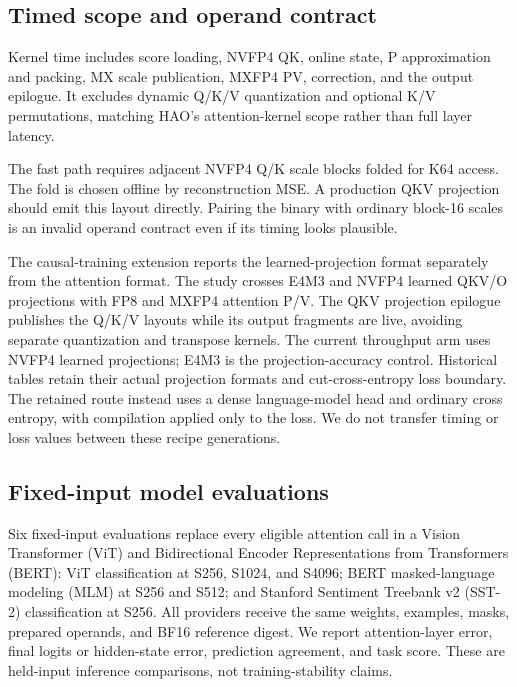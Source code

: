 \subsection{Timed scope and operand contract}

Kernel time includes score loading, NVFP4 QK, online state, P approximation
and packing, MX scale publication, MXFP4 PV, correction, and the output
epilogue. It excludes dynamic Q/K/V quantization and optional K/V
permutations, matching HAO's attention-kernel scope rather than full layer
latency.

The fast path requires adjacent NVFP4 Q/K scale blocks folded for K64 access.
The fold is chosen offline by reconstruction MSE. A production QKV projection
should emit this layout directly. Pairing the binary with ordinary block-16
scales is an invalid operand contract even if its timing looks plausible.

The causal-training extension reports the learned-projection format separately
from the attention format.  The study crosses E4M3 and NVFP4 learned QKV/O
projections with FP8 and MXFP4 attention P/V.  The QKV projection epilogue
publishes the Q/K/V layouts while its output fragments are live, avoiding
separate quantization and transpose kernels.  The current throughput arm uses
NVFP4 learned projections; E4M3 is the projection-accuracy control.  Historical
tables retain their actual projection formats and cut-cross-entropy loss
boundary.  The retained route instead uses a dense language-model head and
ordinary cross entropy, with compilation applied only to the loss.  We do not
transfer timing or loss values between these recipe generations.

\subsection{Fixed-input model evaluations}

Six fixed-input evaluations replace every eligible attention call in a Vision
Transformer (ViT) and Bidirectional Encoder Representations from Transformers
(BERT): ViT classification at S256, S1024, and S4096; BERT masked-language
modeling (MLM) at S256 and S512; and Stanford Sentiment Treebank v2 (SST-2)
classification at S256. All providers receive the same weights, examples,
masks, prepared operands, and BF16 reference digest. We report attention-layer
error, final logits or hidden-state error, prediction agreement, and task
score. These are held-input inference comparisons, not training-stability
claims.

